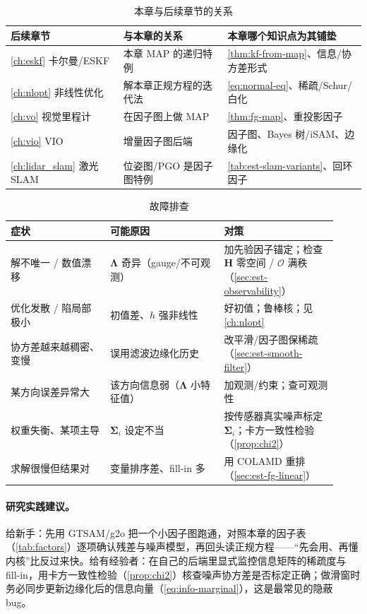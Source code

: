 \begin{table}[ht]\centering\small
\caption{本章与后续章节的关系}
\begin{tabular}{lll}
\toprule
后续章节 & 与本章的关系 & 本章哪个知识点为其铺垫 \\
\midrule
\cref{ch:eskf} 卡尔曼/ESKF & 本章 MAP 的递归特例 & \cref{thm:kf-from-map}、信息/协方差形式 \\
\cref{ch:nlopt} 非线性优化 & 解本章正规方程的迭代法 & \cref{eq:normal-eq}、稀疏/Schur/白化 \\
\cref{ch:vo} 视觉里程计 & 在因子图上做 MAP & \cref{thm:fg-map}、重投影因子 \\
\cref{ch:vio} VIO & 增量因子图后端 & 因子图、Bayes 树/iSAM、边缘化 \\
\cref{ch:lidar_slam} 激光 SLAM & 位姿图/PGO 是因子图特例 & \cref{tab:est-slam-variants}、回环因子 \\
\bottomrule
\end{tabular}
\end{table}

\begin{table}[ht]\centering\small
\caption{故障排查}
\begin{tabular}{p{0.28\linewidth}p{0.32\linewidth}p{0.32\linewidth}}
\toprule
症状 & 可能原因 & 对策 \\
\midrule
解不唯一 / 数值漂移 & $\boldsymbol{\Lambda}$ 奇异（gauge/不可观测） & 加先验因子锚定；检查 $\mathbf{H}$ 零空间 / $\mathcal{O}$ 满秩（\cref{sec:est-observability}） \\
优化发散 / 陷局部极小 & 初值差、$h$ 强非线性 & 好初值；鲁棒核；见 \cref{ch:nlopt} \\
协方差越来越稠密、变慢 & 误用滤波边缘化历史 & 改平滑/因子图保稀疏（\cref{sec:est-smooth-filter}） \\
某方向误差异常大 & 该方向信息弱（$\boldsymbol{\Lambda}$ 小特征值） & 加观测/约束；查可观测性 \\
权重失衡、某项主导 & $\boldsymbol{\Sigma}_i$ 设定不当 & 按传感器真实噪声标定 $\boldsymbol{\Sigma}_i$；卡方一致性检验（\cref{prop:chi2}） \\
求解很慢但结果对 & 变量排序差、fill-in 多 & 用 COLAMD 重排（\cref{sec:est-fg-linear}） \\
\bottomrule
\end{tabular}
\end{table}

\paragraph{研究实践建议。}
给新手：先用 GTSAM/g2o 把一个小因子图跑通，对照本章的因子表（\cref{tab:factors}）逐项确认残差与噪声模型，再回头读正规方程——“先会用、再懂内核”比反过来快。给有经验者：在自己的后端里显式监控信息矩阵的稀疏度与 fill-in，用卡方一致性检验（\cref{prop:chi2}）核查噪声协方差是否标定正确；做滑窗时务必同步更新边缘化后的信息向量（\cref{eq:info-marginal}），这是最常见的隐蔽 bug。

